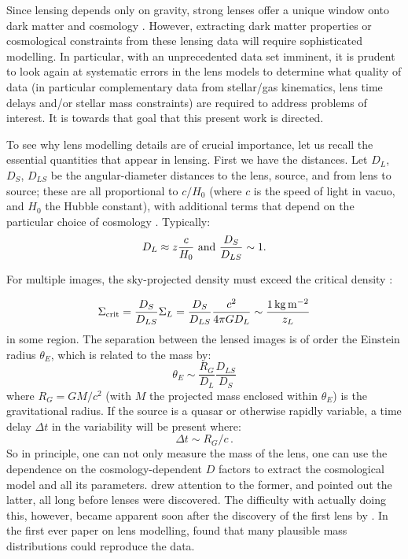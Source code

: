 \documentclass[galley,usenatbib]{mn2e}
\begin{document}
Since lensing depends only on gravity, strong lenses offer a
unique window onto dark matter and cosmology \citep{2010CQGra..27w3001B,2012arXiv1206.1225A}. However, 
extracting dark matter properties or cosmological constraints from these lensing data will require sophisticated modelling. In particular, with an unprecedented data set imminent, it is prudent to look again at systematic errors in the lens models to determine what quality of data (in particular complementary data from stellar/gas kinematics, lens time delays and/or stellar mass constraints) are required to address problems of interest. It is towards that goal that this present work is directed.

To see why lens modelling details are of crucial importance, let us recall the
essential quantities that appear in lensing.  First we have the
distances. Let $D_L$, $D_S$, $D_{LS}$ be the angular-diameter
distances to the lens, source, and from lens to source; these are all proportional to $c/H_0$ (where $c$ is the speed of light in vacuo, and $H_0$ the Hubble constant), with additional terms that depend on the particular choice of cosmology \citep[e.g.][]{1999coph.book.....P}. Typically:
\begin{equation}
D_L \approx z \frac c{H_0}\ \hbox{and}\ \frac{D_S}{D_{LS}} \sim 1.
\end{equation}

For multiple images, the sky-projected density must exceed the critical
density \citep[e.g.][]{1992grle.book.....S}:

\begin{equation}
\Sigma_{\rm crit} = \frac{D_S}{D_{LS}} \Sigma_L = \frac{D_S}{D_{LS}} \frac{c^2}{4\pi G D_L} \sim \frac{1\rm\,kg\,m^{-2}}{z_L}
\end{equation}
in some region.  The separation between the lensed images is of order
the Einstein radius $\theta_E$, which is related to
the mass by:
\begin{equation}
\theta_E \sim \frac{R_G}{D_L} \frac{D_{LS}}{D_S}
\end{equation}
where $R_G = GM/c^2$ (with $M$ the projected mass enclosed within $\theta_E$) is the gravitational radius. If the source is a
quasar or otherwise rapidly variable, a time delay $\Delta t$ in the variability
will be present where:
\begin{equation}
\Delta t \sim R_G/c \,.
\end{equation}
So in principle, one can not only measure the mass of the lens, one
can use the dependence on the cosmology-dependent $D$ factors to
extract the cosmological model and all its parameters.
\cite{1937ApJ....86..217Z} drew attention to the former, and
\cite{1964MNRAS.128..307R,1966MNRAS.132..101R} pointed out the latter,
all long before lenses were discovered.  The difficulty with actually doing this, however, became
apparent soon after the discovery of the first lens by
\cite{1979Natur.279..381W}.  In the first ever paper on lens
modelling, \cite{1981ApJ...244..736Y} found that many plausible mass
distributions could reproduce the data.
\end{document}
